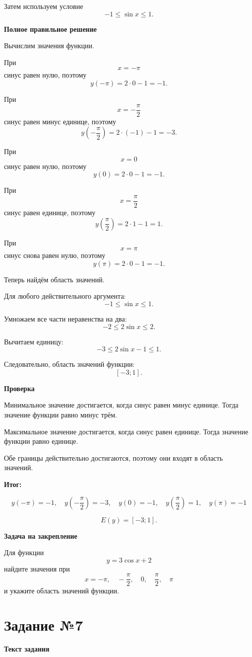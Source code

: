 \documentclass[12pt,a4paper]{article}
\newcommand{\result}{\textcolor{teal!60!black}{Итог:}}
\begin{document}
Затем используем условие
\[
-1\le \sin x\le 1.
\]

\textbf{Полное правильное решение}

Вычислим значения функции.

При
\[
x=-\pi
\]
синус равен нулю, поэтому
\[
y(-\pi)=2\cdot 0-1=-1.
\]

При
\[
x=-\frac{\pi}{2}
\]
синус равен минус единице, поэтому
\[
y\left(-\frac{\pi}{2}\right)=2\cdot(-1)-1=-3.
\]

При
\[
x=0
\]
синус равен нулю, поэтому
\[
y(0)=2\cdot 0-1=-1.
\]

При
\[
x=\frac{\pi}{2}
\]
синус равен единице, поэтому
\[
y\left(\frac{\pi}{2}\right)=2\cdot 1-1=1.
\]

При
\[
x=\pi
\]
синус снова равен нулю, поэтому
\[
y(\pi)=2\cdot 0-1=-1.
\]

Теперь найдём область значений.

Для любого действительного аргумента:
\[
-1\le \sin x\le 1.
\]

Умножаем все части неравенства на два:
\[
-2\le 2\sin x\le 2.
\]

Вычитаем единицу:
\[
-3\le 2\sin x-1\le 1.
\]

Следовательно, область значений функции:
\[
[-3;1].
\]

\textbf{Проверка}

Минимальное значение достигается, когда синус равен минус единице. Тогда значение функции равно минус трём.

Максимальное значение достигается, когда синус равен единице. Тогда значение функции равно единице.

Обе границы действительно достигаются, поэтому они входят в область значений.

\textbf{\result}

\[
\boxed{
y(-\pi)=-1,\quad
y\left(-\frac{\pi}{2}\right)=-3,\quad
y(0)=-1,\quad
y\left(\frac{\pi}{2}\right)=1,\quad
y(\pi)=-1
}
\]

\[
\boxed{E(y)=[-3;1].}
\]

\textbf{Задача на закрепление}

Для функции
\[
y=3\cos x+2
\]
найдите значения при
\[
x=-\pi,\quad -\frac{\pi}{2},\quad 0,\quad \frac{\pi}{2},\quad \pi
\]
и укажите область значений функции.

\newpage

\label{task:7}
\section*{Задание №7}
\textbf{Текст задания}
\end{document}
